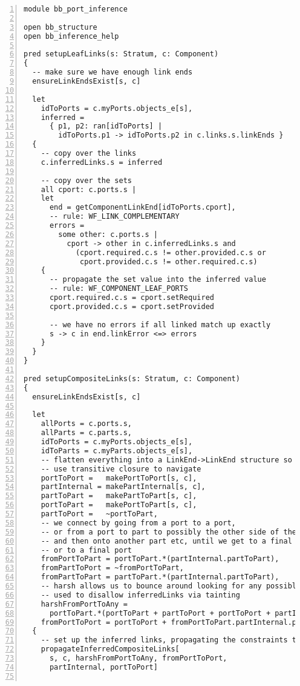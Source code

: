 \lstset{frame=tb, aboveskip=12pt, belowskip=-3pt, breaklines=true, tabsize=2, mathescape=true}
\begin{lstlisting}[caption={bb\_port\_inference.als}, numbers=left]
module bb_port_inference

open bb_structure
open bb_inference_help

pred setupLeafLinks(s: Stratum, c: Component)
{
  -- make sure we have enough link ends
  ensureLinkEndsExist[s, c]

  let
    idToPorts = c.myPorts.objects_e[s],
    inferred =
      { p1, p2: ran[idToPorts] |
        idToPorts.p1 -> idToPorts.p2 in c.links.s.linkEnds }
  {
    -- copy over the links
    c.inferredLinks.s = inferred

    -- copy over the sets
    all cport: c.ports.s |
    let
      end = getComponentLinkEnd[idToPorts.cport],
      -- rule: WF_LINK_COMPLEMENTARY
      errors =
        some other: c.ports.s |
          cport -> other in c.inferredLinks.s and
            (cport.required.c.s != other.provided.c.s or
             cport.provided.c.s != other.required.c.s)
    {
      -- propagate the set value into the inferred value
      -- rule: WF_COMPONENT_LEAF_PORTS
      cport.required.c.s = cport.setRequired
      cport.provided.c.s = cport.setProvided
  
      -- we have no errors if all linked match up exactly
      s -> c in end.linkError <=> errors
    }
  }
}

pred setupCompositeLinks(s: Stratum, c: Component)
{
  ensureLinkEndsExist[s, c]

  let
    allPorts = c.ports.s,
    allParts = c.parts.s,
    idToPorts = c.myPorts.objects_e[s],
    idToParts = c.myParts.objects_e[s],
    -- flatten everything into a LinkEnd->LinkEnd structure so we can
    -- use transitive closure to navigate
    portToPort =   makePortToPort[s, c],
    partInternal = makePartInternal[s, c],
    partToPart =   makePartToPart[s, c],
    portToPart =   makePortToPart[s, c],
    partToPort =   ~portToPart,
    -- we connect by going from a port to a port,
    -- or from a port to part to possibly the other side of the part
    -- and then onto another part etc, until we get to a final part,
    -- or to a final port
    fromPortToPart = portToPart.*(partInternal.partToPart),
    fromPartToPort = ~fromPortToPart,
    fromPartToPart = partToPart.*(partInternal.partToPart),
    -- harsh allows us to bounce around looking for any possibly connected other elements.
    -- used to disallow inferredLinks via tainting
    harshFromPortToAny =
      portToPart.*(portToPart + partToPort + portToPort + partInternal + partToPart),
    fromPortToPort = portToPort + fromPortToPart.partInternal.partToPort
  {
    -- set up the inferred links, propagating the constraints to the next level
    propagateInferredCompositeLinks[
      s, c, harshFromPortToAny, fromPortToPort,
      partInternal, portToPort]


\end{lstlisting}
